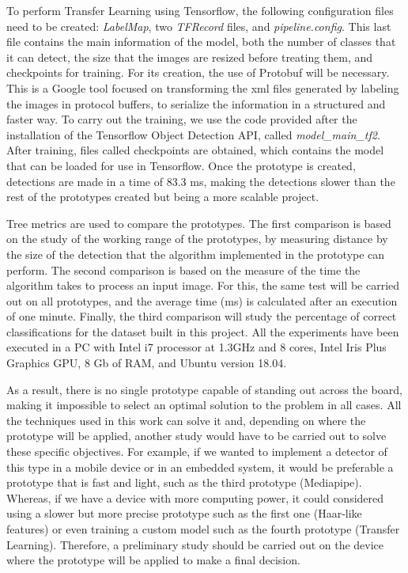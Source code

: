 To perform Transfer Learning using Tensorflow, the following configuration files need to be created: \textit{LabelMap}, two \textit{TFRecord} files, and \textit{pipeline.config}. This last file contains the main information of the model, both the number of classes that it can detect, the size that the images are resized before treating them, and checkpoints for training. For its creation, the use of Protobuf will be necessary. This is a Google tool focused on transforming the xml files generated by labeling the images in protocol buffers, to serialize the information in a structured and faster way. To carry out the training, we use the code provided after the installation of the Tensorflow Object Detection API, called \textit{model\_main\_tf2}. After training, files called checkpoints are obtained, which contains the model that can be loaded for use in Tensorflow. Once the prototype is created, detections are made in a time of 83.3 ms, making the detections slower than the rest of the prototypes created but being a more scalable project.

Tree metrics are used to compare the prototypes. The first comparison is based on the study of the working range of the prototypes, by measuring distance by the size of the detection that the algorithm implemented in the prototype can perform. The second comparison is based on the measure of the time the algorithm takes to process an input image. For this, the same test will be carried out on all prototypes, and the average time (ms) is calculated after an execution of one minute. Finally, the third comparison will study the percentage of correct classifications for the dataset built in this project. All the experiments have been executed in a PC with Intel i7 processor at 1.3GHz and 8 cores, Intel Iris Plus Graphics GPU, 8 Gb of RAM, and Ubuntu version 18.04.

As a result, there is no single prototype capable of standing out across the board, making it impossible to select an optimal solution to the problem in all cases. All the techniques used in this work can solve it and, depending on where the prototype will be applied, another study would have to be carried out to solve these specific objectives. For example, if we wanted to implement a detector of this type in a mobile device or in an embedded system, it would be preferable a prototype that is fast and light, such as the third prototype (Mediapipe). Whereas, if we have a device with more computing power, it could considered using a slower but more precise prototype such as the first one (Haar-like features) or even training a custom model such as the fourth prototype (Transfer Learning). Therefore, a preliminary study should be carried out on the device where the prototype will be applied to make a final decision.


